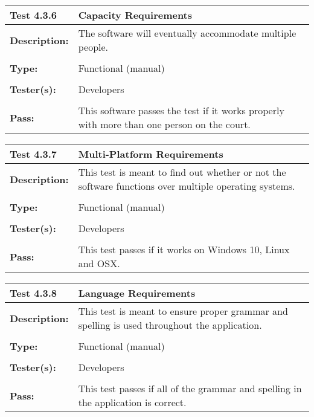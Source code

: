 \documentclass{article}
\begin{document}
\begin{tabularx}{\textwidth}{p{2cm}p{9cm}}
\toprule 
{\bf Test 4.3.6} & {\bf Capacity Requirements}\\
\midrule
\textbf{Description:} & The software will eventually accommodate multiple people. \\[0.3\baselineskip]
                      &                     \\
\textbf{Type:} & Functional (manual)   \\[0.3\baselineskip]
                      &                     \\
\textbf{Tester(s):} & Developers \\[0.3\baselineskip]
                      &                     \\
\textbf{Pass:} & This software passes the test if it works properly with more than one person on the court. \\[0.3\baselineskip]
\end{tabularx}

\begin{tabularx}{\textwidth}{p{2cm}p{9cm}}
\toprule 
{\bf Test 4.3.7} & {\bf Multi-Platform Requirements}\\
\midrule
\textbf{Description:} &  This test is meant to find out whether or not the software functions over multiple operating systems.\\[0.3\baselineskip]
                      &                     \\
\textbf{Type:} & Functional (manual)   \\[0.3\baselineskip]
                      &                     \\
\textbf{Tester(s):} & Developers \\[0.3\baselineskip]
                      &                     \\
\textbf{Pass:} & This test passes if it works on Windows 10, Linux and OSX. \\[0.3\baselineskip]
\end{tabularx}

\begin{tabularx}{\textwidth}{p{2cm}p{9cm}}
\toprule 
{\bf Test 4.3.8} & {\bf Language Requirements}\\
\midrule
\textbf{Description:} &  This test is meant to ensure proper grammar and spelling is used throughout the application.\\[0.3\baselineskip]
                      &                     \\
\textbf{Type:} & Functional (manual)   \\[0.3\baselineskip]
                      &                     \\
\textbf{Tester(s):} & Developers \\[0.3\baselineskip]
                      &                     \\
\textbf{Pass:} & This test passes if all of the grammar and spelling in the application is correct. \\[0.3\baselineskip]
\bottomrule
\end{tabularx}
\end{document}
